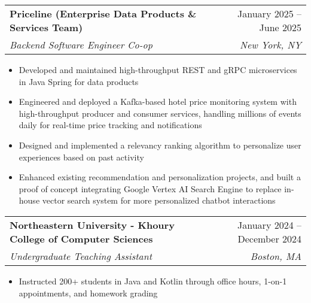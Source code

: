 \documentclass[letterpaper,11pt]{article}
\makeatletter
\newcommand{\resumeItem}[1]{
  \item\small{
    {#1 \vspace{-2pt}}
  }
}
\newcommand{\resumeSubheading}[4]{
  \vspace{-2pt}\item
    \begin{tabular*}{0.97\textwidth}[t]{l@{\extracolsep{\fill}}r}
      \textbf{#1} & #2 \\
      \textit{\small#3} & \textit{\small #4} \\
    \end{tabular*}\vspace{-7pt}
}
\newcommand{\resumeItemListStart}{\begin{itemize}}
\newcommand{\resumeItemListEnd}{\end{itemize}\vspace{-5pt}}
\makeatother
\begin{document}
  \resumeSubheading
  {Priceline (Enterprise Data Products \& Services Team)}{January 2025 -- June 2025}
  {Backend Software Engineer Co-op}{New York, NY}
  \resumeItemListStart
    \resumeItem{Developed and maintained high-throughput REST and gRPC microservices in Java Spring for data products}%
    \resumeItem{Engineered and deployed a Kafka-based hotel price monitoring system with high-throughput producer and consumer services, handling millions of events daily for real-time price tracking and notifications}
    \resumeItem{Designed and implemented a relevancy ranking algorithm to personalize user experiences based on past activity}
    \resumeItem{Enhanced existing recommendation and personalization projects, and built a proof of concept integrating Google Vertex AI Search Engine to replace in-house vector search system for more personalized chatbot interactions}
  \resumeItemListEnd

  \resumeSubheading
    {Northeastern University - Khoury College of Computer Sciences}{January 2024 -- December 2024}
    {Undergraduate Teaching Assistant}{Boston, MA}
    \resumeItemListStart
      \resumeItem{Instructed 200+ students in Java and Kotlin through office hours, 1-on-1 appointments, and homework grading}
    \resumeItemListEnd
    
\end{document}
